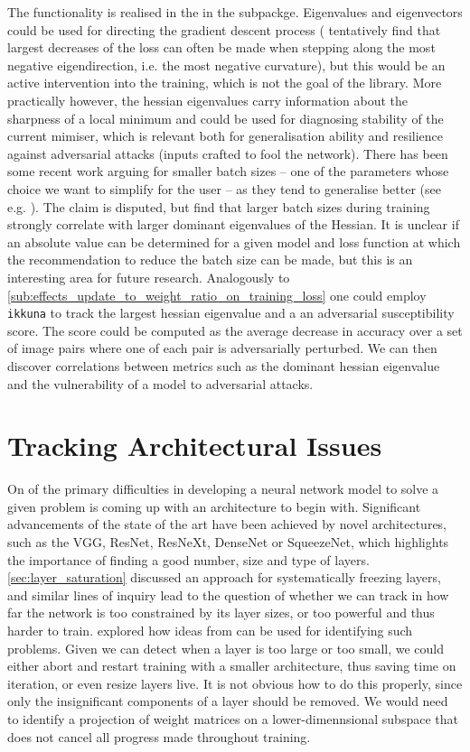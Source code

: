 The functionality is realised in the  in the
 subpackge. Eigenvalues and eigenvectors could
be used for directing the gradient descent process (\citet{alain2018negative}
tentatively find that largest decreases of the loss can often be made when
stepping along the most negative eigendirection, i.e. the most negative
curvature), but this would be an active intervention into the training, which is
not the goal of the library. More practically however, the hessian eigenvalues
carry information about the sharpness of a local minimum and could be used for
diagnosing stability of the current mimiser, which is relevant both for
generalisation ability and resilience against adversarial attacks (inputs
crafted to fool the network). There has been some recent work arguing for
smaller batch sizes -- one of the parameters whose choice we want to simplify
for the user -- as they tend to generalise better (see e.g.
\citep{keskar2016large}). The claim is disputed, but \citet{yao2018hessian} find
that larger batch sizes during training strongly correlate with larger dominant
eigenvalues of the Hessian. It is unclear if an absolute value can be determined
for a given model and loss function at which the recommendation to reduce the
batch size can be made, but this is an interesting area for future research.
Analogously to \cref{sub:effects_update_to_weight_ratio_on_training_loss} one
could employ \texttt{ikkuna} to track the largest hessian eigenvalue and a an
adversarial susceptibility score. The score could be computed as the average
decrease in accuracy over a set of image pairs where one of each pair is
adversarially perturbed. We can then discover correlations between metrics such
as the dominant hessian eigenvalue and the vulnerability of a model to
adversarial attacks.


\section{Tracking Architectural Issues}%
\label{sec:tracking_architecture}

On of the primary difficulties in developing a neural network model to solve a
given problem is coming up with an architecture to begin with. Significant
advancements of the state of the art have been achieved by novel architectures,
such as the VGG, ResNet, ResNeXt, DenseNet or SqueezeNet, which highlights the
importance of finding a good number, size and type of layers.
\cref{sec:layer_saturation} discussed an approach for systematically freezing
layers, and similar lines of inquiry lead to the question of whether we can
track in how far the network is too constrained by its layer sizes, or too
powerful and thus harder to train. \citet{shenk2018} explored how ideas from
\citep{raghu2017svcca} can be used for identifying such problems. Given we can
detect when a layer is too large or too small, we could either abort and restart
training with a smaller architecture, thus saving time on iteration, or even
resize layers live. It is not obvious how to do this properly, since only the
insignificant components of a layer should be removed. We would need to identify
a projection of weight matrices on a lower-dimennsional subspace that does not
cancel all progress made throughout training.
